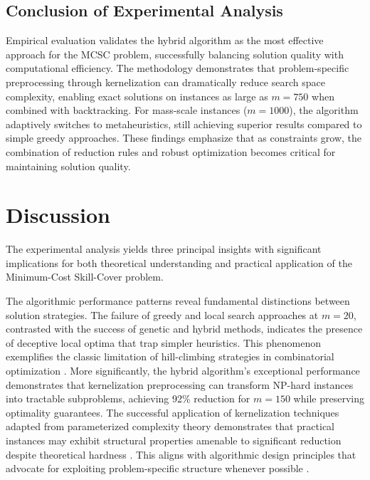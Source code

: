 \documentclass[12pt,a4paper]{article}
\begin{document}
\subsection{Conclusion of Experimental Analysis}
\label{subsec:experimental-conclusion}

Empirical evaluation validates the hybrid algorithm as the most effective approach for the MCSC problem, successfully balancing solution quality with computational efficiency. The methodology demonstrates that problem-specific preprocessing through kernelization can dramatically reduce search space complexity, enabling exact solutions on instances as large as $m=750$ when combined with backtracking. For mass-scale instances ($m=1000$), the algorithm adaptively switches to metaheuristics, still achieving superior results compared to simple greedy approaches. These findings emphasize that as constraints grow, the combination of reduction rules and robust optimization becomes critical for maintaining solution quality.

	
\section{Discussion}
\label{sec:discussion}

The experimental analysis yields three principal insights with significant implications for both theoretical understanding and practical application of the Minimum-Cost Skill-Cover problem.

The algorithmic performance patterns reveal fundamental distinctions between solution strategies. The failure of greedy and local search approaches at $m=20$, contrasted with the success of genetic and hybrid methods, indicates the presence of deceptive local optima that trap simpler heuristics. This phenomenon exemplifies the classic limitation of hill-climbing strategies in combinatorial optimization \cite{kleinberg}. More significantly, the hybrid algorithm's exceptional performance demonstrates that kernelization preprocessing can transform NP-hard instances into tractable subproblems, achieving 92\% reduction for $m=150$ while preserving optimality guarantees. The successful application of kernelization techniques adapted from parameterized complexity theory demonstrates that practical instances may exhibit structural properties amenable to significant reduction despite theoretical hardness \cite{cormen}. This aligns with algorithmic design principles that advocate for exploiting problem-specific structure whenever possible \cite{kleinberg}.
\end{document}
